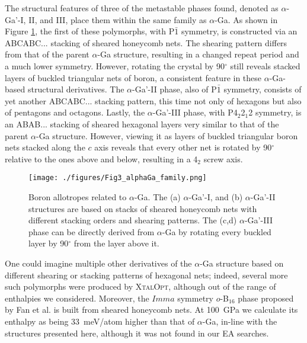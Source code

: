 \documentclass[reprint,aps,prl,twocolumn,letterpaper]{revtex4-2}
\newlength{\figurewidth}
\begin{document}
The structural features of three of the metastable phases found, denoted as $\alpha$-Ga'-I, II, and III, place them within the same family as $\alpha$-Ga. As shown in Figure \ref{fig:alpha_Ga_derivatives_struct.png}, the first of these polymorphs, with P$\bar{1}$ symmetry, is constructed via an ABCABC... stacking of sheared honeycomb nets. The shearing pattern differs from that of the parent $\alpha$-Ga structure, resulting in a changed repeat period and a much lower symmetry. However, rotating the crystal by 90$^\circ$ still reveals stacked layers of buckled triangular nets of boron,  a consistent feature in these $\alpha$-Ga-based structural derivatives. The $\alpha$-Ga'-II phase, also of P$\bar{1}$ symmetry, consists of yet another ABCABC... stacking pattern, this time not only of hexagons but also of pentagons and octagons. Lastly, the $\alpha$-Ga'-III phase, with P4$_{2}$2$_{1}$2 symmetry, is an ABAB... stacking of sheared hexagonal layers very similar to that of the parent $\alpha$-Ga structure. However, viewing it as layers of buckled triangular boron nets stacked along the $c$ axis reveals that every other net is rotated by 90$^\circ$ relative to the ones above and below, resulting in a 4$_{2}$ screw axis. 

\begin{figure}
\begin{center}
\texttt{[image: ./figures/Fig3\_alphaGa\_family.png]}
\end{center}
\caption{Boron allotropes related to $\alpha$-Ga. The (a) $\alpha$-Ga'-I,  and (b) $\alpha$-Ga'-II  structures are based on stacks of sheared honeycomb nets with different stacking orders and shearing patterns. The (c,d) $\alpha$-Ga'-III phase can be directly derived from $\alpha$-Ga by rotating every buckled layer by 90$^\circ$ from the layer above it.
\label{fig:alpha_Ga_derivatives_struct.png}}
\end{figure}

One could imagine multiple other derivatives of the $\alpha$-Ga structure based on different shearing or stacking patterns of hexagonal nets; indeed, several more such polymorphs were produced by \textsc{XtalOpt}, although out of the range of enthalpies we considered. Moreover, the $Imma$ symmetry $o$-B$_{16}$ phase proposed by Fan et al. \cite{Fan:2014} is built from sheared honeycomb nets. At 100~GPa we calculate its enthalpy as being 33~meV/atom higher than that of $\alpha$-Ga, in-line with the structures presented here, although it was not found in our EA searches. 
\end{document}
